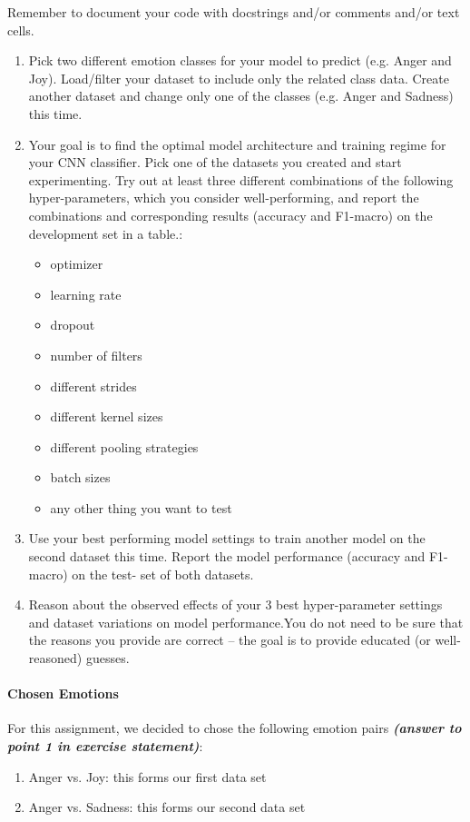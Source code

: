 \documentclass[fleqn,10pt]{SelfArx} %
\begin{document}
Remember to document your code with docstrings and/or comments and/or text cells.

\begin{enumerate}[noitemsep]
    \item Pick two different emotion classes for your model to predict (e.g. Anger and Joy). Load/filter your dataset to include only the related class data. Create another dataset and change only one of the classes (e.g. Anger and Sadness) this time.
    \item Your goal is to find the optimal model architecture and training regime for your CNN classifier. Pick one of the datasets you created and start experimenting. Try out at least three different combinations of the following hyper-parameters, which you consider well-performing, and report the combinations and corresponding results (accuracy and F1-macro) on the development set in a table.:
    \begin{itemize}[noitemsep]
        \item optimizer
        \item learning rate
        \item dropout
        \item number of filters
        \item different strides
        \item different kernel sizes
        \item different pooling strategies
        \item batch sizes
        \item any other thing you want to test
     \end{itemize}
     \item Use your best performing model settings to train another model on the second dataset this time. Report the model performance (accuracy and F1-macro) on the test- set of both datasets.
     \item Reason about the observed effects of your 3 best hyper-parameter settings and dataset variations on model performance.You do not need to be sure that the reasons you provide are correct – the goal is to provide educated (or well-reasoned) guesses.
\end{enumerate}

\paragraph{Chosen Emotions}
For this assignment, we decided to chose the following emotion pairs \textit{\textbf{(answer to point 1 in exercise statement)}}:
\begin{enumerate}[noitemsep]
     \item Anger vs. Joy: this forms our first data set
     \item Anger vs. Sadness: this forms our second data set
\end{enumerate}
\end{document}
